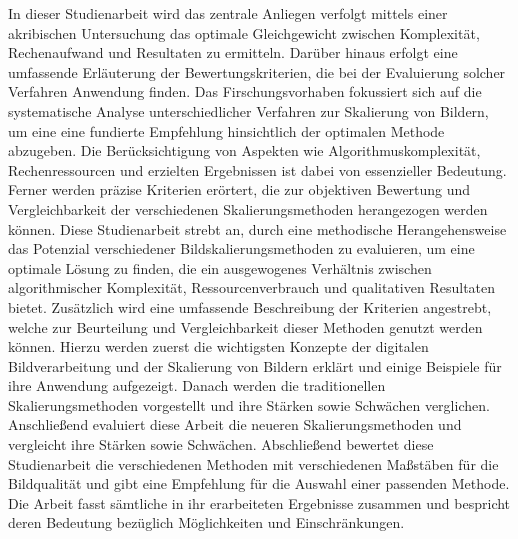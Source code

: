     In dieser Studienarbeit wird das zentrale Anliegen verfolgt mittels einer akribischen Untersuchung das optimale Gleichgewicht zwischen Komplexität, Rechenaufwand und Resultaten zu ermitteln. 
    Darüber hinaus erfolgt eine umfassende Erläuterung der Bewertungskriterien, die bei der Evaluierung solcher Verfahren Anwendung finden. 
    Das Firschungsvorhaben fokussiert sich auf die systematische Analyse unterschiedlicher Verfahren zur Skalierung von Bildern, um eine eine fundierte Empfehlung hinsichtlich der optimalen Methode abzugeben. 
    Die Berücksichtigung von Aspekten wie Algorithmuskomplexität, Rechenressourcen und erzielten Ergebnissen ist dabei von essenzieller Bedeutung. 
    Ferner werden präzise Kriterien erörtert, die zur objektiven Bewertung und Vergleichbarkeit der verschiedenen Skalierungsmethoden herangezogen werden können.
    Diese Studienarbeit strebt an, durch eine methodische Herangehensweise das Potenzial verschiedener Bildskalierungsmethoden zu evaluieren, um eine optimale Lösung zu finden, die ein ausgewogenes Verhältnis zwischen algorithmischer Komplexität, Ressourcenverbrauch und qualitativen Resultaten bietet. 
    Zusätzlich wird eine umfassende Beschreibung der Kriterien angestrebt, welche zur Beurteilung und Vergleichbarkeit dieser Methoden genutzt werden können.
    Hierzu werden zuerst die wichtigsten Konzepte der digitalen Bildverarbeitung und der Skalierung von Bildern erklärt und einige Beispiele für ihre Anwendung aufgezeigt. 
    Danach werden die traditionellen Skalierungsmethoden vorgestellt und  ihre Stärken sowie Schwächen verglichen. 
    Anschließend evaluiert diese Arbeit die neueren Skalierungsmethoden und vergleicht ihre Stärken sowie Schwächen. 
    Abschließend bewertet diese Studienarbeit die verschiedenen Methoden mit verschiedenen Maßstäben für die Bildqualität und gibt eine Empfehlung für die Auswahl einer passenden Methode. 
    Die Arbeit fasst sämtliche in ihr erarbeiteten Ergebnisse zusammen und bespricht deren Bedeutung bezüglich Möglichkeiten und Einschränkungen.
    \newpage
